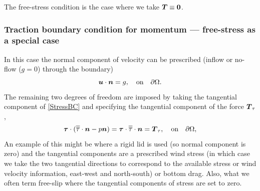 The free-stress condition is the case where we take ${\mbox{\boldmath$T$}}\equiv{\mbox{\boldmath$0$}}$.

\subsubsection{Traction boundary condition for momentum --- free-stress as a special case}\label{sec:bc_vector_traction}
In this case the normal component of velocity can be prescribed (\eg inflow or
no-flow ($g=0$) through the boundary)
\begin{equation*}
{\mbox{\boldmath$u$}}\cdot{\mbox{\boldmath$n$}} = g,\quad \textrm{on}\quad \partial\Omega.
\end{equation*}
The remaining two degrees of freedom are imposed by taking the
tangential component of \eqref{StressBC} and specifying the tangential component
of the force ${\mbox{\boldmath$T$}}_{\tau}$, \ie
\begin{equation*}
{\mbox{\boldmath$\tau$}}\cdot(\overline{\overline{\tau}}\cdot{\mbox{\boldmath$n$}} - p{\mbox{\boldmath$n$}}) = {\mbox{\boldmath$\tau$}}\cdot\overline{\overline{\tau}}\cdot{\mbox{\boldmath$n$}} = {\mbox{\boldmath$T$}}_{\tau},\quad \textrm{on}\quad \partial\Omega,
\end{equation*}
An example of this might be where a rigid lid is used (so normal component is zero)
and the tangential components are a prescribed wind stress (in which case we take
the two tangential directions to correspond to the available stress or wind velocity
information, \ie east-west and north-south) or bottom drag. Also, what we often term free-slip
where the tangential components of stress are set to zero.

